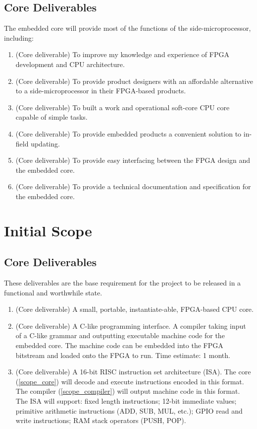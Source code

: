 \documentclass[11pt,a4paper]{article}
\begin{document}
\subsection{Core Deliverables}
The embedded core will provide most of the functions of the side-microprocessor, including:
\begin{enumerate}
\item{(Core deliverable) To improve my knowledge and experience of FPGA  development and CPU architecture.}
\item{(Core deliverable) To provide product designers with an affordable alternative to a side-microprocessor in their FPGA-based products.}
\item{(Core deliverable) To built a work and operational soft-core CPU core capable of simple tasks.}
\item{(Core deliverable) To provide embedded products a convenient solution to in-field updating.}
\item{(Core deliverable) To provide easy interfacing between the FPGA design and the embedded core.} 
\item{(Core deliverable) To provide a technical documentation and specification for the embedded core.} 
\end{enumerate}

\section{Initial Scope}
\subsection{Core Deliverables}
These deliverables are the base requirement for the project to be released in a functional and worthwhile state.

\begin{enumerate}
\item{(Core deliverable) A small, portable, instantiate-able, FPGA-based CPU core.}\label{scope_core}
\item{(Core deliverable) A C-like programming interface. A compiler taking input of a C-like grammar and outputting executable machine code for the embedded core. The machine code can be embedded into the FPGA bitstream and loaded onto the FPGA to run. Time estimate: 1 month.}\label{scope_compiler}
\item{(Core deliverable) A 16-bit RISC instruction set architecture (ISA). The core (\ref{scope_core}) will decode and execute instructions encoded in this format. The compiler (\ref{scope_compiler}) will output machine code in this format. The ISA will support: fixed length instructions; 12-bit immediate values; primitive arithmetic instructions (ADD, SUB, MUL, etc.); GPIO read and write instructions; RAM stack operators (PUSH, POP).}
\end{enumerate}
\end{document}
